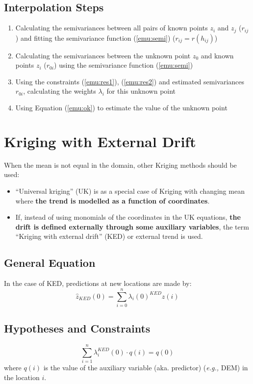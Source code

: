 \documentclass{article}
\begin{document}
\subsection{Interpolation Steps}
\begin{enumerate}[1)]
    \item Calculating the semivariances between all pairs of known points $z_i$ and $z_j$ ($r_{ij}$) and fitting the semivariance function (\ref{emu:semi}) ($r_{ij}=r(h_{ij})$)
    \item Calculating the semivariances between the unknown point $z_0$ and known points $z_i$ ($r_{0i}$) using the semivariance function (\ref{emu:semi})
    \item Using the constraints (\ref{emu:res1}), (\ref{emu:res2}) and estimated semivariances $r_{0i}$, calculating the weights $\lambda_i$ for this unknown point
    \item Using Equation (\ref{emu:ok}) to estimate the value of the unknown point
\end{enumerate}

\section{Kriging with External Drift}

When the mean is not equal in the domain, other Kriging methods should be used:
\begin{itemize}
    \item “Universal kriging” (UK) is as a special case of Kriging with changing mean where \textbf{the trend is modelled as a function of coordinates}. 
    \item If, instead of using monomials of the coordinates in the UK equations, \textbf{the drift is defined externally through some auxiliary variables}, the term “Kriging with external drift” (KED) or external trend is used.
\end{itemize}

\subsection{General Equation}
In the case of KED, predictions at new locations are made by:
\begin{equation}
    \hat{z}_{KED}(0)=\sum_{i=0}^{n}\lambda_i(0)^{KED}z(i)
\end{equation}

\subsection{Hypotheses and Constraints}
\begin{equation}
    \sum_{i=1}^n\lambda_i^{KED}(0)\cdot q(i)=q(0)
\end{equation}
where $q(i)$ is the value of the auxiliary variable (aka. predictor) (\textit{e.g.,} DEM) in the location $i$.
\end{document}
